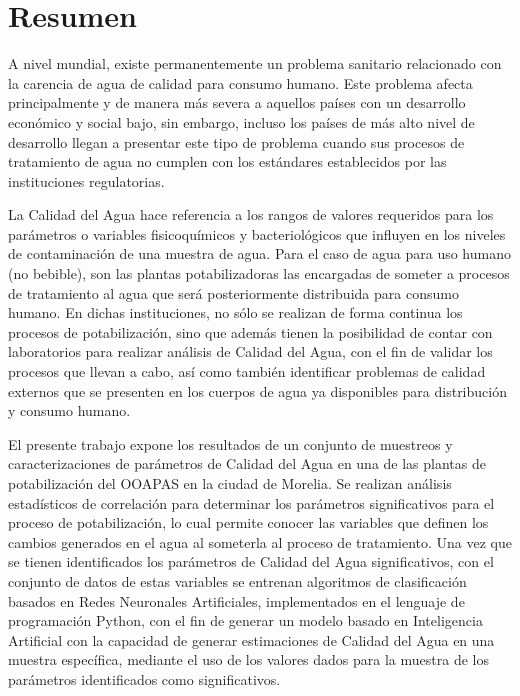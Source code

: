 \chapter*{Resumen} %

A nivel mundial, existe permanentemente un problema sanitario relacionado con la carencia de agua de calidad para consumo humano. Este problema afecta principalmente y de manera más severa a aquellos países con un desarrollo 
económico y social bajo, sin embargo, incluso los países de más alto nivel de desarrollo llegan a presentar este tipo de problema cuando sus procesos de tratamiento de agua no cumplen con los estándares establecidos por las 
instituciones regulatorias.

La Calidad del Agua hace referencia a los rangos de valores requeridos para los parámetros o variables fisicoquímicos y bacteriológicos que influyen en los niveles de contaminación de una muestra de agua. Para el caso de agua 
para uso humano (no bebible), son las plantas potabilizadoras las encargadas de someter a procesos de tratamiento al agua que será posteriormente distribuida para consumo humano. En dichas instituciones, no sólo se realizan de 
forma continua los procesos de potabilización, sino que además tienen la posibilidad de contar con laboratorios para realizar análisis de Calidad del Agua, con el fin de validar los procesos que llevan a cabo, así como también
identificar problemas de calidad externos que se presenten en los cuerpos de agua ya disponibles para distribución y consumo humano.

El presente trabajo expone los resultados de un conjunto de muestreos y caracterizaciones de parámetros de Calidad del Agua en una de las plantas de potabilización del OOAPAS en la ciudad de Morelia. Se realizan análisis estadísticos 
de correlación para determinar los parámetros significativos para el proceso de potabilización, lo cual permite conocer las variables que definen los cambios generados en el agua al someterla al proceso de tratamiento. Una vez que se 
tienen identificados los parámetros de Calidad del Agua significativos, con el conjunto de datos de estas variables se entrenan algoritmos de clasificación basados en Redes Neuronales Artificiales, implementados en el lenguaje de 
programación Python, con el fin de generar un modelo basado en Inteligencia Artificial con la capacidad de generar estimaciones de Calidad del Agua en una muestra específica, mediante el uso de los valores dados para la muestra de 
los parámetros identificados como significativos.
